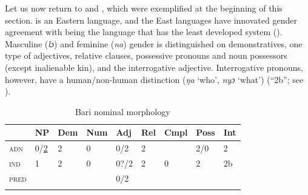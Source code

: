 \documentclass[output=collectionpaper]{langsci/langscibook}
\begin{document}
Let us now return to  and , which were exemplified at the beginning of this section.  is an Eastern  language, and the East  languages have innovated gender agreement with  being the language that has the least developed system (\citealt[257]{Heine1983}). Masculine (\textit{lɔ}) and feminine (\textit{na}) gender is distinguished on demonstratives, one type of adjectives, relative clauses, possessive pronouns and noun possessors (except inalienable kin), and the interrogative adjective. Interrogative pronouns, however, have a human/non-human distinction (\textit{ŋa} `who', \textit{nyɔ} `what') (``2b''; see ).

\begin{table}
\caption{Bari nominal morphology}
\begin{tabular}{>{\scshape}l*{8}{l}}
\lsptoprule
  &	NP	&	Dem	&	Num	&	Adj	&	Rel	&	Cmpl	&	Poss	&	Int	\\
\midrule
adn	&	0/\uline{2}	&	2	&	0	&	0/2	&	2	&		&	2/0	&	2	\\
ind	&	1	&	2	&	0	&	0?/2	&	2	&	0	&	2	&	2b	\\
pred	&		&		&		&	0/2	&		&		&		&		\\
\lspbottomrule
\end{tabular}
\label{tab:WDG:10}
\end{table}
\end{document}
